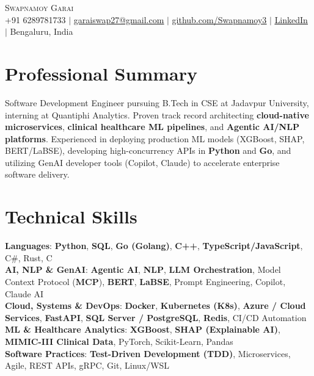\documentclass[letterpaper,9.5pt]{article}
\begin{document}
\begin{center}
    {\Huge \scshape Swapnamoy Garai} \\ \vspace{1pt}
    \small +91 6289781733 $|$ 
    \href{mailto:garaiswap27@gmail.com}{\underline{garaiswap27@gmail.com}} $|$ 
    \href{https://github.com/Swapnamoy3}{\underline{github.com/Swapnamoy3}} $|$ 
    \href{https://www.linkedin.com/in/swapnamoygarai}{\underline{LinkedIn}} $|$ 
    Bengaluru, India
\end{center}

\section{Professional Summary}
\small{
Software Development Engineer pursuing B.Tech in CSE at Jadavpur University, interning at Quantiphi Analytics. Proven track record architecting \textbf{cloud-native microservices}, \textbf{clinical healthcare ML pipelines}, and \textbf{Agentic AI/NLP platforms}. Experienced in deploying production ML models (XGBoost, SHAP, BERT/LaBSE), developing high-concurrency APIs in \textbf{Python} and \textbf{Go}, and utilizing GenAI developer tools (Copilot, Claude) to accelerate enterprise software delivery.
}

\section{Technical Skills}
 \begin{itemize}[leftmargin=0.15in, label={}]
    \small{\item{
     \textbf{Languages}{: \textbf{Python}, \textbf{SQL}, \textbf{Go (Golang)}, \textbf{C++}, \textbf{TypeScript/JavaScript}, C\#, Rust, C} \\
     \textbf{AI, NLP \& GenAI}{: \textbf{Agentic AI}, \textbf{NLP}, \textbf{LLM Orchestration}, Model Context Protocol (\textbf{MCP}), \textbf{BERT}, \textbf{LaBSE}, Prompt Engineering, Copilot, Claude AI} \\
     \textbf{Cloud, Systems \& DevOps}{: \textbf{Docker}, \textbf{Kubernetes (K8s)}, \textbf{Azure / Cloud Services}, \textbf{FastAPI}, \textbf{SQL Server / PostgreSQL}, \textbf{Redis}, CI/CD Automation} \\
     \textbf{ML \& Healthcare Analytics}{: \textbf{XGBoost}, \textbf{SHAP (Explainable AI)}, \textbf{MIMIC-III Clinical Data}, PyTorch, Scikit-Learn, Pandas} \\
     \textbf{Software Practices}{: \textbf{Test-Driven Development (TDD)}, Microservices, Agile, REST APIs, gRPC, Git, Linux/WSL}
    }}
 \end{itemize}
\end{document}
